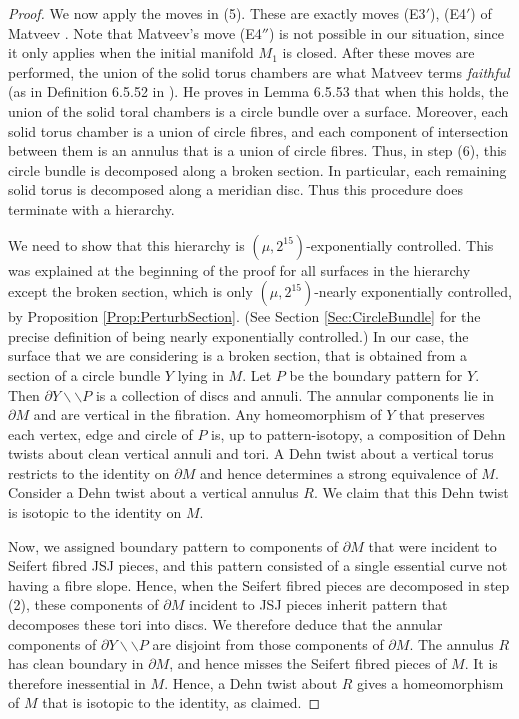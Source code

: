 \documentclass[oneside]{amsart}
\numberwithin{equation}{section}
\theoremstyle{plain}
\theoremstyle{definition}
\newcommand{\cut}{\backslash\backslash}
\begin{document}
\begin{proof}
We now apply the moves in (5). These are exactly moves (E3$'$), (E4$'$) of Matveev \cite{Matveev}. Note that Matveev's move (E4$''$) is not possible in our situation, since it only applies when the initial manifold $M_1$ is closed. After these moves are performed, the union of the solid torus chambers are what Matveev terms \emph{faithful} (as in Definition 6.5.52 in \cite{Matveev}). He proves in Lemma 6.5.53 that when this holds, the union of the solid toral chambers is a circle bundle over a surface. Moreover, each solid torus chamber is a union of circle fibres, and each component of intersection between them is an annulus that is a union of circle fibres. 
Thus, in step (6), this circle bundle is decomposed along a broken section. In particular, each remaining solid torus is decomposed along a meridian disc. Thus this procedure does terminate with a hierarchy.

We need to show that this hierarchy is $(\mu,2^{15})$-exponentially controlled. This was explained at the beginning of the proof for all surfaces in the hierarchy except the broken section, which is only $(\mu,2^{15})$-nearly exponentially controlled, by Proposition \ref{Prop:PerturbSection}. (See Section \ref{Sec:CircleBundle} for the precise definition of being nearly exponentially controlled.) In our case, the surface that we are considering is a broken section, that is obtained from a section of a circle bundle $Y$ lying in $M$. Let $P$ be the boundary pattern for $Y$. Then $\partial Y \cut P$ is a collection of discs and annuli. The annular components lie in $\partial M$ and are vertical in the fibration. Any homeomorphism of $Y$ that preserves each vertex, edge and circle of $P$ is, up to pattern-isotopy, a composition of Dehn twists about clean vertical annuli and tori. A Dehn twist about a vertical torus restricts to the identity on $\partial M$ and hence determines a strong equivalence of $M$. Consider a Dehn twist about a vertical annulus $R$. We claim that this Dehn twist is isotopic to the identity on $M$. 

Now, we assigned boundary pattern to components of $\partial M$ that were incident to Seifert fibred JSJ pieces, and this pattern consisted of a single essential curve not having a fibre slope. Hence, when the Seifert fibred pieces are decomposed in step (2), these components of $\partial M$ incident to JSJ pieces inherit pattern that decomposes these tori into discs. We therefore deduce that the annular components of $\partial Y \cut P$ are disjoint from those components of $\partial M$. The annulus $R$ has clean boundary in $\partial M$, and hence misses the Seifert fibred pieces of $M$. It is therefore inessential in $M$. Hence, a Dehn twist about $R$ gives a homeomorphism of $M$ that is isotopic to the identity, as claimed.


\end{proof}
\end{document}
